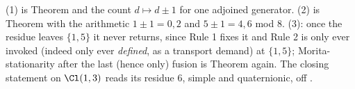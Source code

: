 (1) is Theorem  and the count $d \mapsto d \pm 1$ for one adjoined generator. (2) is Theorem  with the arithmetic $1 \pm 1 = 0, 2$ and $5 \pm 1 = 4, 6$ mod $8$. (3): once the residue leaves $\{1, 5\}$ it never returns, since Rule 1 fixes it and Rule 2 is only ever invoked (indeed only ever \emph{defined}, as a transport demand) at $\{1,5\}$; Morita-stationarity after the last (hence only) fusion is Theorem  again. The closing statement on $\Cl(1,3)$ reads its residue $6$, simple and quaternionic, off .
